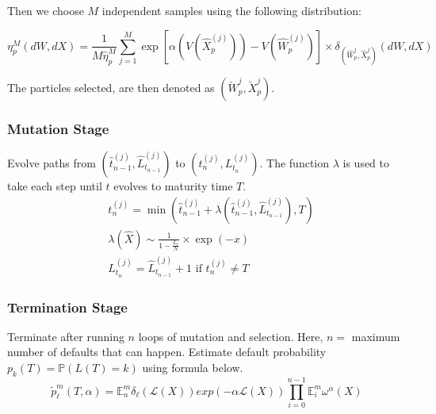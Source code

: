 Then we choose $M$ independent samples using the following distribution:

\begin{equation}
	\eta_{p}^{M} (dW,dX) = \frac{1}{M \hat{\eta}_{p}^{M}} \sum_{j=1}^{M} 
	\exp \left[ \alpha \left( V(\hat{X}_{p}^{(j)}) \right) - V(\hat{W}^{(j)}_{p}) 
	\right] \times \delta_{(\hat{W}_p^{j},\hat{X}_p^{j})} (dW,dX)
\end{equation}

The particles selected, are then denoted as $(\breve{W}_p^{j},\breve{X}_p^{j})$.

\subsubsection{Mutation Stage}
Evolve paths from $\left( \hat{t}_{n-1}^{(j)}, \hat{L}_{t_{n-1}}^{(j)}\right)$ to $\left(t^{(j)}_{n}, L_{t_{n}}^{(j)} \right)$.
The function $\lambda$ is used to take each step until $t$ evolves to maturity time $T$. 
		\begin{equation*}
				\begin{split}
					&t^{(j)}_{n}= \min\left(\hat{t}^{(j)}_{n-1} + \lambda\left(\hat{t}^{(j)}_{n-1},\hat{L}_{t_{n-1}}^{(j)}\right),T\right) \\
					& \lambda\left(\hat{X}\right) \sim \frac{1}{1-\frac{L_{t}}{N}} \times \exp(-x) \\
					&L_{t_{n}}^{(j)} = \hat{L}_{t_{n-1}}^{(j)} + 1 \text{ if } t^{(j)}_{n} 		\neq T					
				\end{split}	
		\end{equation*}

\subsubsection{Termination Stage}
Terminate after running $n$ loops of mutation and selection. Here, $n =$ maximum number of defaults that can happen.
 Estimate default probability $p_k(T) = \mathbb{P}\left( L\left( T \right) = k
		      \right)$ using formula below.
\begin{equation*}
	\tilde{p}^m_{\ell}(T,\alpha) = \mathbb{E}^{m}_{n}{\delta_{\ell}(\mathcal{L}(X))exp(-\alpha \mathcal{L}(X))}\prod_{i=0}^{n-1}\mathbb{E}_{i}^{m}\omega^{\alpha}(X)
\end{equation*}

